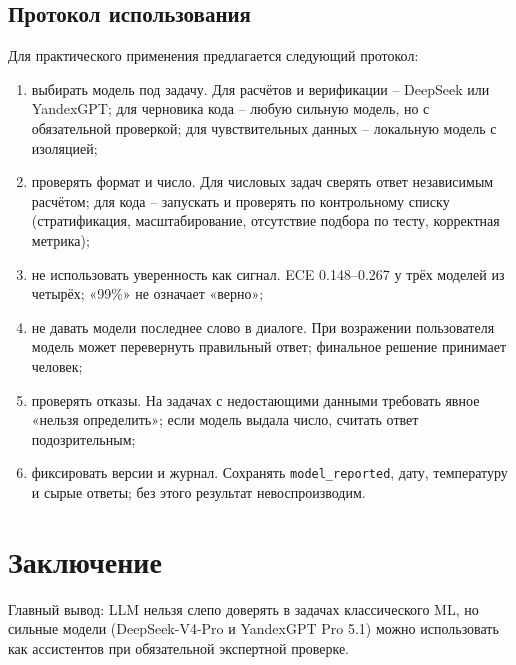 \documentclass{bmstu}
\begin{document}
\section{Протокол использования}
Для практического применения предлагается следующий протокол:
\begin{enumerate}[label=\arabic*), leftmargin=1.425\parindent, itemsep=0pt, topsep=-\parskip, wide=1.2cm]
\item выбирать модель под задачу. Для расчётов и верификации -- DeepSeek или YandexGPT; для черновика кода -- любую сильную модель, но с обязательной проверкой; для чувствительных данных -- локальную модель с изоляцией;
\item проверять формат и число. Для числовых задач сверять ответ независимым расчётом; для кода -- запускать и проверять по контрольному списку (стратификация, масштабирование, отсутствие подбора по тесту, корректная метрика);
\item не использовать уверенность как сигнал. ECE 0.148--0.267 у трёх моделей из четырёх; «99\%» не означает «верно»;
\item не давать модели последнее слово в диалоге. При возражении пользователя модель может перевернуть правильный ответ; финальное решение принимает человек;
\item проверять отказы. На задачах с недостающими данными требовать явное «нельзя определить»; если модель выдала число, считать ответ подозрительным;
\item фиксировать версии и журнал. Сохранять \texttt{model\_reported}, дату, температуру и сырые ответы; без этого результат невоспроизводим.
\end{enumerate}

\chapter*{Заключение}

Главный вывод: LLM нельзя слепо доверять в задачах классического ML, но сильные модели (DeepSeek-V4-Pro и YandexGPT Pro 5.1) можно использовать как ассистентов при обязательной экспертной проверке.
\end{document}
